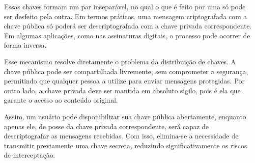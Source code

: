 \documentclass[12pt,a4paper,twoside]{report}
\begin{document}
Essas chaves formam um par inseparável, no qual o que é feito por uma só pode ser desfeito pela outra. Em termos práticos, uma mensagem criptografada com a chave pública só poderá ser descriptografada com a chave privada correspondente. Em algumas aplicações, como nas assinaturas digitais, o processo pode ocorrer de forma inversa.

Esse mecanismo resolve diretamente o problema da distribuição de chaves. A chave pública pode ser compartilhada livremente, sem comprometer a segurança, permitindo que qualquer pessoa a utilize para enviar mensagens protegidas. Por outro lado, a chave privada deve ser mantida em absoluto sigilo, pois é ela que garante o acesso ao conteúdo original.

Assim, um usuário pode disponibilizar sua chave pública abertamente, enquanto apenas ele, de posse da chave privada correspondente, será capaz de descriptografar as mensagens recebidas. Com isso, elimina-se a necessidade de transmitir previamente uma chave secreta, reduzindo significativamente os riscos de interceptação.
\end{document}
